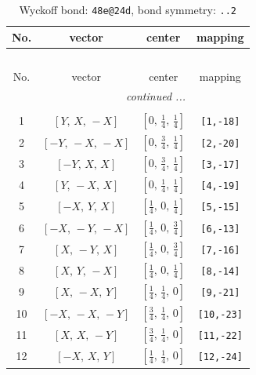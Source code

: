 \documentclass[fleqn,8pt]{jsarticle}
\begin{document}
\renewcommand{\arraystretch}{1.2}
\begin{longtable}{cccc}
\caption{Wyckoff bond: {\tt 48e@24d}, bond symmetry: {\tt ..2}}
 \\
 \hline \hline
No. & vector & center & mapping \\ \hline \endfirsthead

\multicolumn{3}{l}{\tablename\ \thetable{}} \\
 \hline \hline
No. & vector & center & mapping \\ \hline \endhead

 \hline \hline
\multicolumn{3}{r}{\footnotesize\it continued ...} \\ \endfoot

 \hline \hline
\multicolumn{3}{r}{} \\ \endlastfoot

1 & $\left[ Y,\, X,\, - X \right]$ & $\left[ 0,\, \frac{1}{4},\, \frac{1}{4} \right]$ & {\tt [1,-18]} \\ \hline
2 & $\left[ - Y,\, - X,\, - X \right]$ & $\left[ 0,\, \frac{3}{4},\, \frac{1}{4} \right]$ & {\tt [2,-20]} \\ \hline
3 & $\left[ - Y,\, X,\, X \right]$ & $\left[ 0,\, \frac{3}{4},\, \frac{1}{4} \right]$ & {\tt [3,-17]} \\ \hline
4 & $\left[ Y,\, - X,\, X \right]$ & $\left[ 0,\, \frac{1}{4},\, \frac{1}{4} \right]$ & {\tt [4,-19]} \\ \hline
5 & $\left[ - X,\, Y,\, X \right]$ & $\left[ \frac{1}{4},\, 0,\, \frac{1}{4} \right]$ & {\tt [5,-15]} \\ \hline
6 & $\left[ - X,\, - Y,\, - X \right]$ & $\left[ \frac{1}{4},\, 0,\, \frac{3}{4} \right]$ & {\tt [6,-13]} \\ \hline
7 & $\left[ X,\, - Y,\, X \right]$ & $\left[ \frac{1}{4},\, 0,\, \frac{3}{4} \right]$ & {\tt [7,-16]} \\ \hline
8 & $\left[ X,\, Y,\, - X \right]$ & $\left[ \frac{1}{4},\, 0,\, \frac{1}{4} \right]$ & {\tt [8,-14]} \\ \hline
9 & $\left[ X,\, - X,\, Y \right]$ & $\left[ \frac{1}{4},\, \frac{1}{4},\, 0 \right]$ & {\tt [9,-21]} \\ \hline
10 & $\left[ - X,\, - X,\, - Y \right]$ & $\left[ \frac{3}{4},\, \frac{1}{4},\, 0 \right]$ & {\tt [10,-23]} \\ \hline
11 & $\left[ X,\, X,\, - Y \right]$ & $\left[ \frac{3}{4},\, \frac{1}{4},\, 0 \right]$ & {\tt [11,-22]} \\ \hline
12 & $\left[ - X,\, X,\, Y \right]$ & $\left[ \frac{1}{4},\, \frac{1}{4},\, 0 \right]$ & {\tt [12,-24]} \\
\end{longtable}
\end{document}
